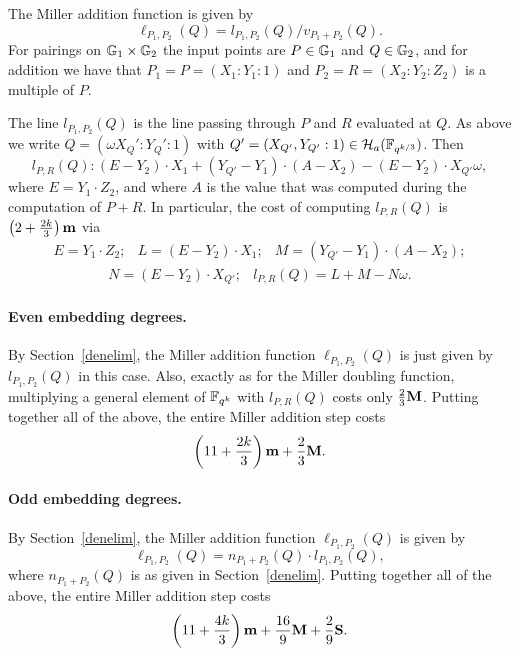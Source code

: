 The Miller addition function is given by
\[\ell_{P_1,P_2}(Q) = l_{P_1,P_2}(Q)/v_{P_1 + P_2}(Q).\]
For pairings on $\mathbb{G}_{1} \times \mathbb{G}_{2}$ the input points are $P \in \mathbb{G}_{1}$ and
$Q \in \mathbb{G}_{2}$, and for addition we have that
 $P_1  = P = (X_1:Y_1:1)$ and $P_2 = R = (X_2:Y_2:Z_2)$ is a multiple of $P$.
 
The line $l_{P_1,P_2}(Q)$ is the line passing through $P$ and $R$ evaluated at $Q$.
As above we write $Q = (\omega X_Q':Y_Q':1)$ with
$Q' = (X_{Q'},Y_{Q'}:1) \in \mathcal{H}_a(\mathbb{F}_{q^{k/3}})$.
Then
$$l_{P,R}(Q): (E - Y_2) \cdot X_1 + (Y_{Q'} - Y_1) \cdot (A - X_2) - (E - Y_2) \cdot X_{Q'}\omega,  $$
where $E = Y_1 \cdot Z_2$, and where $A$ is the value that was computed during the computation of $P+R$.
In particular, the cost of computing $l_{P,R}(Q)$ is $\left(2 + \frac{2k}{3}\right)\textbf{m}$ via
\[\begin{array}{ccc}
E = Y_1 \cdot Z_2; & L = (E-Y_2)\cdot X_1; 
& M = (Y_{Q'} - Y_1) \cdot (A - X_2); 
\end{array}\]
\[\begin{array}{cc}
N = (E - Y_2) \cdot X_{Q'}; &
l_{P,R}(Q) = L + M - N\omega.
\end{array}\]

\paragraph*{Even embedding degrees.}

By Section~\ref{denelim}, the Miller addition function $\ell_{P_1,P_2}(Q)$ is just given by $l_{P_1,P_2}(Q)$ in this case. 
Also, exactly as for the Miller doubling function, multiplying a general element of $\mathbb{F}_{q^k}$ with $l_{P,R}(Q)$ costs only
$\frac{2}{3}\textbf{M}$.
Putting together all of the above, the entire Miller addition step costs
\[\left(11 + \frac{2k}{3}\right)\textbf{m} + \frac{2}{3}\textbf{M}.\]

\paragraph*{Odd embedding degrees.}

By Section~\ref{denelim}, the Miller addition function $\ell_{P_1,P_2}(Q)$ is given by
\[\ell_{P_1,P_2}(Q) = n_{P_1+P_2}(Q) \cdot l_{P_1,P_2}(Q),\]
where $n_{P_1+P_2}(Q)$ is as given in Section~\ref{denelim}.
Putting together all of the above, the entire Miller addition step costs
$$\left(11 + \frac{4k}{3}\right)\textbf{m} + \frac{16}{9}\textbf{M} + \frac{2}{9}\textbf{S}.$$

